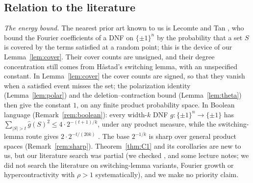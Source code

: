 \documentclass[11pt,reqno]{amsart}
\theoremstyle{definition}
\begin{document}
\subsection*{Relation to the literature}
\emph{The energy bound.}  The nearest prior art known to us is Lecomte and
Tan \cite{LT}, who bound the Fourier coefficients of a DNF on $\{\pm1\}^n$ by
the probability that a set $S$ is covered by the terms satisfied at a random
point; this is the device of our Lemma~\ref{lem:cover}.  Their cover counts
are unsigned, and their degree concentration still comes from Håstad's
switching lemma, with an unspecified constant.  In Lemma~\ref{lem:cover} the
cover counts are signed, so that they vanish when a satisfied event misses
the set; the polarization identity (Lemma~\ref{lem:polar}) and the
deletion--contraction bound (Lemma~\ref{lem:theta}) then give the constant
$1$, on any finite product probability space.  In Boolean language
(Remark~\ref{rem:boolean}): every width-$k$ DNF $g:\{\pm1\}^n\to\{\pm1\}$
has $\sum_{|S|>t}\hat g(S)^2\le4\cdot2^{-(t+1)/k}$, under any product measure,
while the switching-lemma route gives $2\cdot2^{-t/(20k)}$ \cite[\S4.4]{OD}.
The base $2^{-1/k}$ is sharp over general product spaces
(Remark~\ref{rem:sharp}).  Theorem~\ref{thm:C1} and its corollaries are new to
us, but our literature search was partial (we checked \cite{LT}, \cite{OD} and
some lecture notes; we did not search the literature on switching-lemma
variants, Fourier growth or hypercontractivity with $\rho>1$
systematically), and we make no priority claim.
\end{document}
